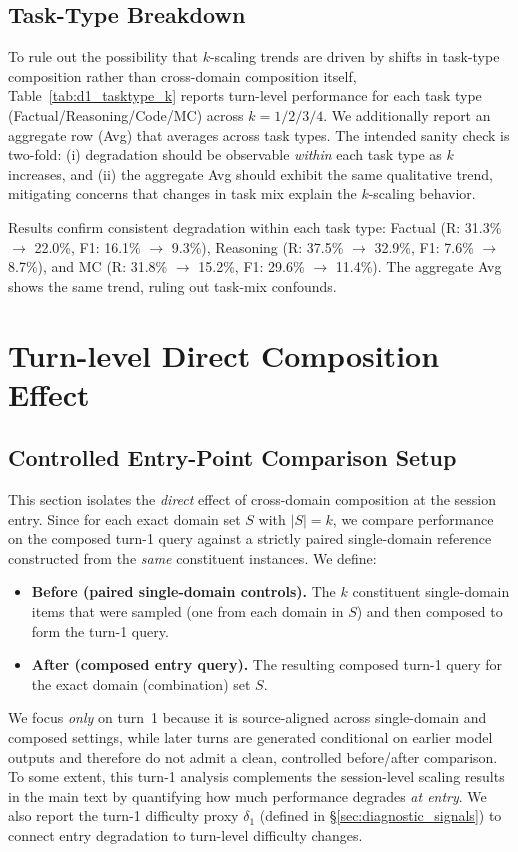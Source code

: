 \subsection{Task-Type Breakdown}
To rule out the possibility that $k$-scaling trends are driven by shifts in task-type composition rather than cross-domain composition itself, Table~\ref{tab:d1_tasktype_k} reports turn-level performance for each task type (Factual/Reasoning/Code/MC) across $k{=}1/2/3/4$. We additionally report an aggregate row (Avg) that averages across task types. The intended sanity check is two-fold: (i) degradation should be observable \emph{within} each task type as $k$ increases, and (ii) the aggregate Avg should exhibit the same qualitative trend, mitigating concerns that changes in task mix explain the $k$-scaling behavior.

Results confirm consistent degradation within each task type: Factual (R: 31.3\% $\rightarrow$ 22.0\%, F1: 16.1\% $\rightarrow$ 9.3\%), Reasoning (R: 37.5\% $\rightarrow$ 32.9\%, F1: 7.6\% $\rightarrow$ 8.7\%), and MC (R: 31.8\% $\rightarrow$ 15.2\%, F1: 29.6\% $\rightarrow$ 11.4\%). The aggregate Avg shows the same trend, ruling out task-mix confounds.

\section{Turn-level Direct Composition Effect}
\label{app:combo_breakdown}

\subsection{Controlled Entry-Point Comparison Setup}
This section isolates the \emph{direct} effect of cross-domain composition at the session entry.
Since for each exact domain set $S$ with $|S|{=}k$, we compare performance on the composed turn-1 query against a strictly paired single-domain reference constructed from the \emph{same} constituent instances.
We define:
\begin{itemize}
  \item \textbf{Before (paired single-domain controls).} The $k$ constituent single-domain items that were sampled (one from each domain in $S$) and then composed to form the turn-1 query.
  \item \textbf{After (composed entry query).} The resulting composed turn-1 query for the exact domain (combination) set $S$.
\end{itemize}
We focus \emph{only} on turn~1 because it is source-aligned across single-domain and composed settings, while later turns are generated conditional on earlier model outputs and therefore do not admit a clean, controlled before/after comparison. To some extent, this turn-1 analysis complements the session-level scaling results in the main text by quantifying how much performance degrades \emph{at entry}.
We also report the turn-1 difficulty proxy $\delta_1$ (defined in \S\ref{sec:diagnostic_signals}) to connect entry degradation to turn-level difficulty changes.


